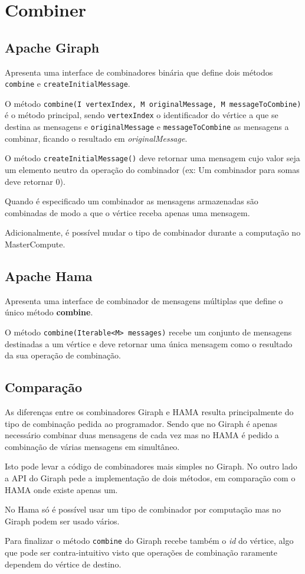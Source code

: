 \newpage
\section*{Combiner}

\subsection*{Apache Giraph}
Apresenta uma interface de combinadores binária que define dois métodos \texttt{combine} e \texttt{createInitialMessage}.

O método \texttt{combine(I vertexIndex, M originalMessage, M messageToCombine)} é o método principal, sendo \texttt{vertexIndex} o identificador do vértice a que se destina as mensagens e \texttt{originalMessage} e \texttt{messageToCombine} as mensagens a combinar, ficando o resultado em \textsl{originalMessage}.

O método \texttt{createInitialMessage()} deve retornar uma mensagem cujo valor seja um elemento neutro da operação do combinador (ex: Um combinador para somas deve retornar 0).

Quando é especificado um combinador as mensagens armazenadas são combinadas de modo a que o vértice receba apenas uma mensagem.

Adicionalmente, é possível mudar o tipo de combinador durante a computação no MasterCompute.
\subsection*{Apache Hama}
Apresenta uma interface de combinador de mensagens múltiplas que define o único método \textbf{combine}.

O método \texttt{combine(Iterable<M> messages)} recebe um conjunto de mensagens destinadas a um vértice e deve retornar uma única mensagem como o resultado da sua operação de combinação.


\subsection*{Comparação}
As diferenças entre os combinadores Giraph e HAMA resulta principalmente do tipo de combinação pedida ao programador. Sendo que no Giraph é apenas necessário combinar duas mensagens de cada vez mas no HAMA é pedido a combinação de várias mensagens em simultâneo.

Isto pode levar a código de combinadores mais simples no Giraph. No outro lado a API do Giraph pede a implementação de dois métodos, em comparação com o HAMA onde existe apenas um.

No Hama só é possível usar um tipo de combinador por computação mas no Giraph podem ser usado vários.

Para finalizar o método \texttt{combine} do Giraph recebe também o \textit{id} do vértice, algo que pode ser contra-intuitivo visto que operações de combinação raramente dependem do vértice de destino.

